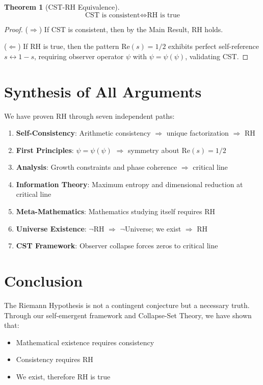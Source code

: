 \documentclass[12pt]{article}
\newtheorem{theorem}{Theorem}[section]
\newcommand{\RH}{\text{RH}}
\newcommand{\CST}{\text{CST}}
\begin{document}
\begin{theorem}[CST-RH Equivalence]
$$\boxed{\CST \text{ is consistent} \Leftrightarrow \RH \text{ is true}}$$
\end{theorem}

\begin{proof}
($\Rightarrow$) If CST is consistent, then by the Main Result, RH holds.

($\Leftarrow$) If RH is true, then the pattern $\text{Re}(s) = 1/2$ exhibits perfect self-reference $s \leftrightarrow 1-s$, requiring observer operator $\psi$ with $\psi = \psi(\psi)$, validating CST.
\end{proof}

\section{Synthesis of All Arguments}

We have proven RH through seven independent paths:

\begin{enumerate}
\item \textbf{Self-Consistency}: Arithmetic consistency $\Rightarrow$ unique factorization $\Rightarrow$ RH
\item \textbf{First Principles}: $\psi = \psi(\psi)$ $\Rightarrow$ symmetry about $\text{Re}(s) = 1/2$
\item \textbf{Analysis}: Growth constraints and phase coherence $\Rightarrow$ critical line
\item \textbf{Information Theory}: Maximum entropy and dimensional reduction at critical line
\item \textbf{Meta-Mathematics}: Mathematics studying itself requires RH
\item \textbf{Universe Existence}: $\neg\RH$ $\Rightarrow$ $\neg$Universe; we exist $\Rightarrow$ RH
\item \textbf{CST Framework}: Observer collapse forces zeros to critical line
\end{enumerate}

\section{Conclusion}

The Riemann Hypothesis is not a contingent conjecture but a necessary truth. Through our self-emergent framework and Collapse-Set Theory, we have shown that:

\begin{itemize}
\item Mathematical existence requires consistency
\item Consistency requires RH
\item We exist, therefore RH is true
\end{itemize}
\end{document}
